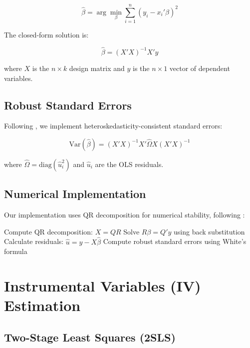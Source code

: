 \documentclass[11pt]{article}
\begin{document}
\begin{equation}
\hat{\beta} = \arg\min_{\beta} \sum_{i=1}^{n} (y_i - x_i'\beta)^2
\end{equation}

The closed-form solution is:

\begin{equation}
\hat{\beta} = (X'X)^{-1}X'y
\end{equation}

where $X$ is the $n \times k$ design matrix and $y$ is the $n \times 1$ vector of dependent variables.

\subsection{Robust Standard Errors}

Following \citet{white1980}, we implement heteroskedasticity-consistent standard errors:

\begin{equation}
\text{Var}(\hat{\beta}) = (X'X)^{-1}X'\hat{\Omega}X(X'X)^{-1}
\end{equation}

where $\hat{\Omega} = \text{diag}(\hat{u}_i^2)$ and $\hat{u}_i$ are the OLS residuals.

\subsection{Numerical Implementation}

Our implementation uses QR decomposition for numerical stability, following \citet{golub2013}:

\begin{algorithm}
\caption{OLS with Numerical Stability}
\begin{algorithmic}[1]
\State Compute QR decomposition: $X = QR$
\State Solve $R\beta = Q'y$ using back substitution
\State Calculate residuals: $\hat{u} = y - X\hat{\beta}$
\State Compute robust standard errors using White's formula
\end{algorithmic}
\end{algorithm}

\section{Instrumental Variables (IV) Estimation}

\subsection{Two-Stage Least Squares (2SLS)}
\end{document}
